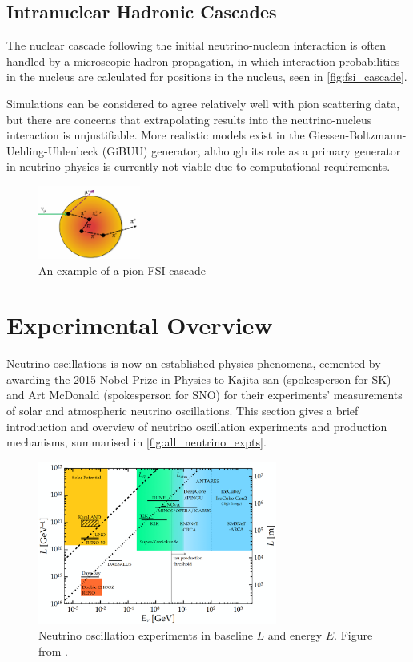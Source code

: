 \subsection{Intranuclear Hadronic Cascades}
The nuclear cascade following the initial neutrino-nucleon interaction is often handled by a microscopic hadron propagation, in which interaction probabilities in the nucleus are calculated for positions in the nucleus, seen in \autoref{fig:fsi_cascade}. 

Simulations can be considered to agree relatively well with pion scattering data\cite{thesis_elder}, but there are concerns that extrapolating results into the neutrino-nucleus interaction is unjustifiable\cite{ulrich_review}. More realistic models exist in the Giessen-Boltzmann-Uehling-Uhlenbeck (GiBUU)\cite{gibuu} generator, although its role as a primary generator in neutrino physics is currently not viable due to computational requirements.
\begin{figure}[h]
	\centering
	\includegraphics[width=0.3\textwidth, trim={0mm 0mm 0mm 0mm}, clip,page=1]{figures/niwg/diagrams/cascade}
	\caption{An example of a pion FSI cascade}
	\label{fig:fsi_cascade}
\end{figure}

\section{Experimental Overview}
\label{sec:exp_overview}
Neutrino oscillations is now an established physics phenomena, cemented by awarding the 2015 Nobel Prize in Physics to Kajita-san (spokesperson for SK) and Art McDonald (spokesperson for SNO) for their experiments' measurements of solar and atmospheric neutrino oscillations. This section gives a brief introduction and overview of neutrino oscillation experiments and production mechanisms, summarised in \autoref{fig:all_neutrino_expts}.
\begin{figure}[h]
	\includegraphics[width=0.7\textwidth, trim={0mm 0mm 0mm 0mm}, clip,page=1]{figures/theory/le_experiments}
	\caption{Neutrino oscillation experiments in baseline $L$ and energy $E$. Figure from \cite{ic_neutrino_2018}.}
	\label{fig:all_neutrino_expts}
\end{figure}

